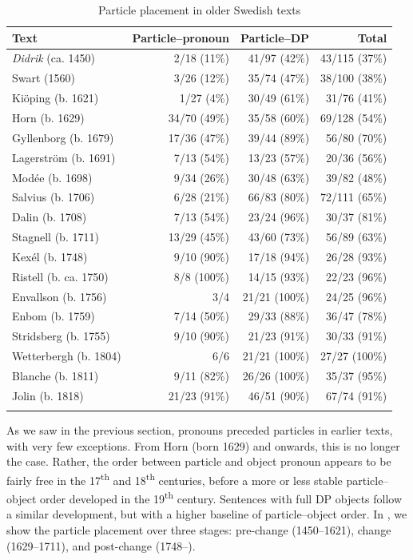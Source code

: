 \documentclass[output=paper]{langscibook}
\begin{document}
\begin{table}
\caption{Particle placement in older Swedish texts}
\label{tab:lalu:2}
\begin{tabularx}{\textwidth}{Xrrr}
\lsptoprule
Text & Particle–pronoun & Particle–DP & Total\\
\midrule
\textit{Didrik} (ca. 1450) & 2/18 (11\%) & 41/97 (42\%) & 43/115 (37\%)\\
Swart (1560) & 3/26 (12\%) & 35/74 (47\%) & 38/100 (38\%)\\
Kiöping (b. 1621) & 1/27 (4\%) & 30/49 (61\%) & 31/76 (41\%)\\
Horn (b. 1629) & 34/70 (49\%) & 35/58 (60\%) & 69/128 (54\%)\\
Gyllenborg (b. 1679) & 17/36 (47\%) & 39/44 (89\%) & 56/80 (70\%)\\
Lagerström  (b. 1691) & 7/13 (54\%) & 13/23 (57\%) & 20/36 (56\%)\\
Modée (b. 1698) & 9/34 (26\%) & 30/48 (63\%) & 39/82 (48\%)\\
Salvius (b. 1706) & 6/28 (21\%) & 66/83 (80\%) & 72/111 (65\%)\\
Dalin (b. 1708) & 7/13 (54\%) & 23/24 (96\%) & 30/37 (81\%)\\
Stagnell (b. 1711) & 13/29 (45\%) & 43/60 (73\%) & 56/89 (63\%)\\
Kexél (b. 1748) & 9/10 (90\%) & 17/18 (94\%) & 26/28 (93\%)\\
Ristell (b. ca. 1750) & 8/8 (100\%) & 14/15 (93\%) & 22/23 (96\%)\\
Envallson (b. 1756) & 3/4 & 21/21 (100\%) & 24/25 (96\%)\\
Enbom (b. 1759) & 7/14 (50\%) & 29/33 (88\%) & 36/47 (78\%)\\
Stridsberg (b. 1755)  & 9/10 (90\%) & 21/23 (91\%) & 30/33 (91\%)\\
Wetterbergh (b. 1804) & 6/6 & 21/21 (100\%) & 27/27 (100\%)\\
Blanche (b. 1811)  & 9/11 (82\%) & 26/26 (100\%) & 35/37 (95\%)\\
Jolin (b. 1818)  & 21/23 (91\%) & 46/51 (90\%) & 67/74 (91\%)\\
\lspbottomrule
\end{tabularx}
\end{table}

As we saw in the previous section, pronouns preceded particles in earlier texts, with very few exceptions. From Horn (born 1629) and onwards, this is no longer the case. Rather, the order between particle and object pronoun appears to be fairly free in the 17\textsuperscript{th} and 18\textsuperscript{th} centuries, before a more or less stable particle–object order developed in the 19\textsuperscript{th} century. Sentences with full DP objects follow a similar development, but with a higher baseline of particle--object order. In , we show the particle placement over three stages: pre-change (1450–1621), change (1629–1711), and post-change (1748–).
\end{document}
